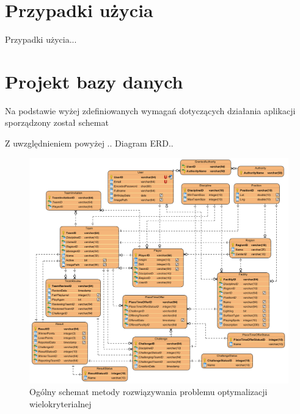 \section{Przypadki użycia}

Przypadki użycia...

\section{Projekt bazy danych}

Na podstawie wyżej zdefiniowanych wymagań dotyczących działania aplikacji sporządzony został schemat 

Z uwzględnieniem powyżej .. Diagram ERD..


\begin{figure}[ht]
\centering
\includegraphics[width=1\linewidth]{04-projekt/rys/erd2.PNG}
\caption{Ogólny schemat metody rozwiązywania problemu optymalizacji wielokryterialnej}
\label{fig:diagram-trad-alg-opt}
\end{figure}

